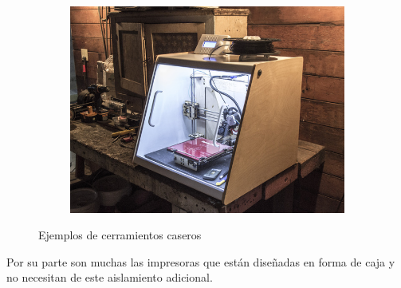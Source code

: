 \documentclass[11pt,a4paper]{article}
\begin{document}
\begin{figure}[H]
\begin{subfigure}[b]{0.3\textwidth}
    \end{subfigure}
    \quad %
    \begin{subfigure}[b]{0.3\textwidth}
        \includegraphics[width=\textwidth,cfbox=azul_marcos 4pt 0pt]{FOTOS/CERRAMIENTO3}
    \end{subfigure}
    \caption*{Ejemplos de cerramientos caseros}
\end{figure}
Por su parte son muchas las impresoras que están diseñadas en forma de caja y no necesitan de este aislamiento adicional.
\end{document}

